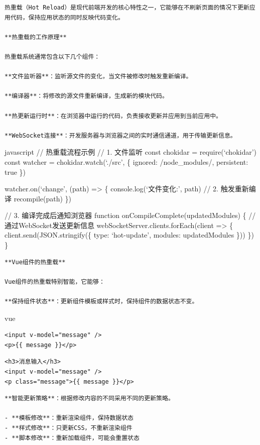 {{\begin{lstlisting}
热重载（Hot Reload）是现代前端开发的核心特性之一，它能够在不刷新页面的情况下更新应用代码，保持应用状态的同时反映代码变化。

**热重载的工作原理**

热重载系统通常包含以下几个组件：

**文件监听器**：监听源文件的变化，当文件被修改时触发重新编译。

**编译器**：将修改的源文件重新编译，生成新的模块代码。

**热更新运行时**：在浏览器中运行的代码，负责接收更新并应用到当前应用中。

**WebSocket连接**：开发服务器与浏览器之间的实时通信通道，用于传输更新信息。
\end{lstlisting}

javascript // 热重载流程示例 // 1. 文件监听 const chokidar = require(`chokidar') const watcher = chokidar.watch(`./src', \{ ignored: /node\_modules/, persistent: true \})

watcher.on(`change', (path) =\textgreater{} \{ console.log(`文件变化:', path) // 2. 触发重新编译 recompile(path) \})

// 3. 编译完成后通知浏览器 function onCompileComplete(updatedModules) \{ // 通过WebSocket发送更新信息 webSocketServer.clients.forEach(client =\textgreater{} \{ client.send(JSON.stringify(\{ type: `hot-update', modules: updatedModules \})) \}) \}

\begin{lstlisting}
**Vue组件的热重载**

Vue组件的热重载特别智能，它能够：

**保持组件状态**：更新组件模板或样式时，保持组件的数据状态不变。
\end{lstlisting}

vue

\begin{verbatim}
<input v-model="message" />
<p>{{ message }}</p>
\end{verbatim}

\begin{verbatim}
<h3>消息输入</h3>
<input v-model="message" />
<p class="message">{{ message }}</p>
\end{verbatim}

\begin{lstlisting}
**智能更新策略**：根据修改内容的不同采用不同的更新策略。

- **模板修改**：重新渲染组件，保持数据状态
- **样式修改**：只更新CSS，不重新渲染组件
- **脚本修改**：重新加载组件，可能会重置状态


\end{lstlisting}}}
